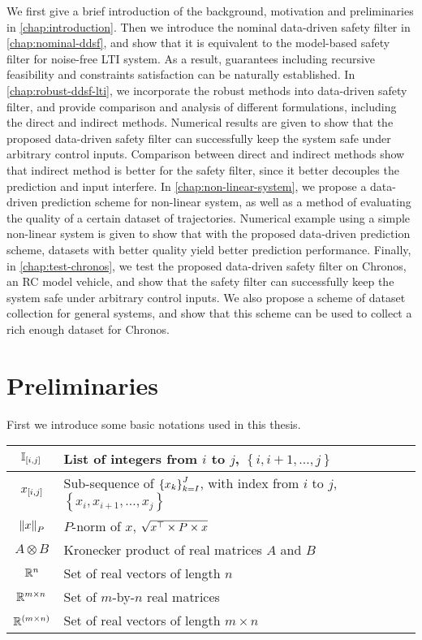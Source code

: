We first give a brief introduction of the background, motivation and preliminaries in \cref{chap:introduction}.
Then we introduce the nominal data-driven safety filter in \cref{chap:nominal-ddsf}, and show that it is equivalent to the model-based safety filter for noise-free LTI system.
As a result, guarantees including recursive feasibility and constraints satisfaction can be naturally established.
In \cref{chap:robust-ddsf-lti}, we incorporate the robust methods into data-driven safety filter, and provide comparison and analysis of different formulations, including the direct and indirect methods.
Numerical results are given to show that the proposed data-driven safety filter can successfully keep the system safe under arbitrary control inputs.
Comparison between direct and indirect methods show that indirect method is better for the safety filter, since it better decouples the prediction and input interfere.
In \cref{chap:non-linear-system}, we propose a data-driven prediction scheme for non-linear system, as well as a method of evaluating the quality of a certain dataset of trajectories.
Numerical example using a simple non-linear system is given to show that with the proposed data-driven prediction scheme, datasets with better quality yield better prediction performance.
Finally, in \cref{chap:test-chronos}, we test the proposed data-driven safety filter on Chronos, an RC model vehicle, and show that the safety filter can successfully keep the system safe under arbitrary control inputs.
We also propose a scheme of dataset collection for general systems, and show that this scheme can be used to collect a rich enough dataset for Chronos.


\section{Preliminaries}\label{sec:preliminaries}

First we introduce some basic notations used in this thesis.

{\renewcommand{\arraystretch}{1.5}%
\begin{center}
\begin{tabular}{ c|l }
    $\mathbb{I}_{\left[ i, j \right]}$ & List of integers from $i$ to $j$, $\left\{ i, i+1, \dots, j \right\}$ \\
    \hline
    $x_{\left[ i, j \right]}$ & Sub-sequence of $\left\{x_k\right\}_{k=I}^{J}$, with index from $i$ to $j$, $\left\{ x_i, x_{i+1}, \dots, x_j \right\}$ \\
    \hline
    $\norm{x}_P$ & $P$-norm of $x$, $\sqrt{x^{\top} \times P \times x}$ \\
    \hline
    $A \otimes B$ & Kronecker product of real matrices $A$ and $B$ \\
    \hline
    $\mathbb{R}^n$ & Set of real vectors of length $n$ \\
    \hline
    $\mathbb{R}^{m \times n}$ & Set of $m$-by-$n$ real matrices \\
    \hline
    $\mathbb{R}^{(m \times n)}$ & Set of real vectors of length $m \times n$ \\
\end{tabular}
\end{center}
}

